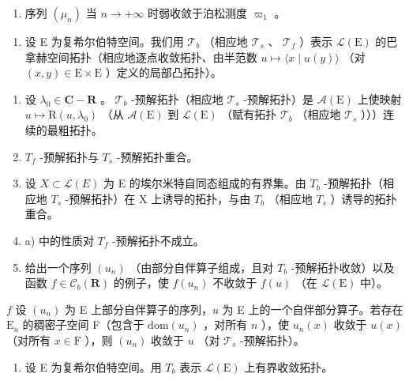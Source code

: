 \begin{enumerate}
\def\labelenumi{\alph{enumi})}
\setcounter{enumi}{5}
\tightlist
\item
  序列 \((\mu_{n})\) 当 \(n \to +\infty\) 时弱收敛于泊松测度 \(\varpi_{1}\) 。
\end{enumerate}

\begin{enumerate}
\def\labelenumi{\arabic{enumi})}
\setcounter{enumi}{28}
\tightlist
\item
  设 E 为复希尔伯特空间。我们用 \(\mathcal{T}_b\) （相应地 \(\mathcal{T}_s\) 、 \(\mathcal{T}_f\) ）表示 \(\mathcal{L}(\mathrm{E})\) 的巴拿赫空间拓扑（相应地逐点收敛拓扑、由半范数 \(u \mapsto \langle x \mid u(y) \rangle\) （对 \((x, y) \in \mathrm{E} \times \mathrm{E}\) ）定义的局部凸拓扑）。
\end{enumerate}

\begin{enumerate}
\def\labelenumi{\alph{enumi})}
\item
  设 \(\lambda_0\in \mathbf{C} - \mathbf{R}\) 。 \(\mathcal{T}_b\) -预解拓扑（相应地 \(\mathcal{T}_s\) -预解拓扑）是 \(\mathcal{A}(\mathrm{E})\) 上使映射 \(u\mapsto \mathrm{R}(u,\lambda_0)\) （从 \(\mathcal{A}(\mathrm{E})\) 到 \(\mathcal{L}(\mathrm{E})\) （赋有拓扑 \(\mathcal{T}_b\) （相应地 \(\mathcal{T}_s\) ）））连续的最粗拓扑。
\item
  \(T_{f}\) -预解拓扑与 \(T_{s}\) -预解拓扑重合。
\item
  设 \(X \subset \mathcal{L}(E)\) 为 E 的埃尔米特自同态组成的有界集。由 \(T_{b}\) -预解拓扑（相应地 \(T_{s}\) -预解拓扑）在 X 上诱导的拓扑，与由 \(T_{b}\) （相应地 \(T_{s}\) ）诱导的拓扑重合。
\item
  a) 中的性质对 \(T_{f}\) -预解拓扑不成立。
\item
  给出一个序列 \((u_{n})\) （由部分自伴算子组成，且对 \(T_{b}\) -预解拓扑收敛）以及函数 \(f \in \mathcal{C}_{b}(\mathbf{R})\) 的例子，使 \(f(u_{n})\) 不收敛于 \(f(u)\) （在 \(\mathcal{L}(\mathrm{E})\) 中）。
\end{enumerate}

\(f\) 设 \((u_n)\) 为 E 上部分自伴算子的序列，\(u\) 为 E 上的一个自伴部分算子。若存在 \(\mathrm{E}_u\) 的稠密子空间 F（包含于 \(\mathrm{dom}(u_n)\) ，对所有 \(n\) ），使 \(u_n(x)\) 收敛于 \(u(x)\) （对所有 \(x \in \mathrm{F}\) ），则 \((u_n)\) 收敛于 \(u\) （对 \(\mathcal{T}_s\) -预解拓扑）。

\begin{enumerate}
\def\labelenumi{\arabic{enumi})}
\setcounter{enumi}{29}
\tightlist
\item
  设 E 为复希尔伯特空间。用 \(T_{b}\) 表示 \(\mathcal{L}(\mathrm{E})\) 上有界收敛拓扑。
\end{enumerate}

